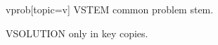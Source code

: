 \begin{problem}{vprob}[topic=v]
	VSTEM common problem stem.
	\begin{solution}
	VSOLUTION only in key copies.
	\end{solution}
\end{problem}
